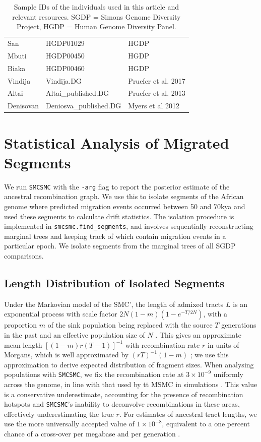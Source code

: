 \documentclass{article}
\begin{document}
\begin{table}[ht]
\begin{tabular}{lll}
  San & HGDP01029 & HGDP \\ 
  Mbuti & HGDP00450 & HGDP \\ 
  Biaka & HGDP00460 & HGDP \\ 
  Vindija & Vindija.DG & Pruefer et al. 2017 \\ 
  Altai & Altai\_published.DG & Pruefer et al. 2013 \\ 
  Denisovan & Deniosva\_published.DG & Myers et al 2012 \\ 
   \hline
\end{tabular}
\caption{Sample IDs of the individuals used in this article and relevant resources. SGDP = Simons Genome Diversity Project, HGDP = Human Genome Diversity Panel.} 
\label{samples}
\end{table}

\clearpage
\section{Statistical Analysis of Migrated Segments} \label{dstats_section}

We run {\tt SMCSMC} with the {\tt -arg} flag to report the posterior estimate of the ancestral recombination graph. We use this to isolate segments of the African genome where predicted migration events occurred between 50 and 70kya and used these segments to calculate drift statistics. The isolation procedure is implemented in {\tt smcsmc.find\_segments}, and involves sequentially reconstructing marginal trees and keeping track of which contain migration events in a particular epoch. We isolate segments from the marginal trees of all SGDP comparisons. 

\subsection{Length Distribution of Isolated Segments}


 Under the Markovian model of the SMC', the length of admixed tracts $L$ is an exponential process with scale factor $2N (1 - m ) \left( 1 - e^{-T / 2N} \right)$, with a proportion $m$ of the sink population being replaced with the source $T$ generations in the past and an effective population size of $N$ \cite{Marjoram2006,Liang953}. This gives an approximate mean length $\left[ (1 -m)r(T-1) \right]^{-1}$ with recombination rate $r$ in units of Morgans, which is well approximated
by  $(rT)^{-1}(1-m)$ \cite{Racimo2015}; we use this approximation to derive expected distribution of fragment sizes. When analysing populations with {\tt SMCSMC}, we fix the recombination rate at $3 \times 10^{-9}$ uniformly across the genome, in line with that used by {tt MSMC} in simulations \cite[Supp.\ section 7]{Schiffels2014a}.
This value is a conservative underestimate, accounting for the presence of recombination hotspots and {\tt SMCSMC}'s inability to deconvolve recombinations in these areas, effectively underestimating the true $r$.  For estimates of ancestral tract lengths, we use the more universally accepted value of $1 \times 10^{-8}$, equivalent to a one percent chance of a cross-over per megabase and per generation \cite{Dumont2008}. 
\end{document}

